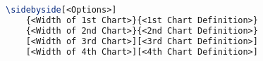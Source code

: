 \begin{lstlisting}[language=LaTeX, label=listing:side-by-side-charts]
\sidebyside[<Options>]
    {<Width of 1st Chart>}{<1st Chart Definition>}
    {<Width of 2nd Chart>}{<2nd Chart Definition>}
    [<Width of 3rd Chart>][<3rd Chart Definition>]
    [<Width of 4th Chart>][<4th Chart Definition>]
\end{lstlisting}